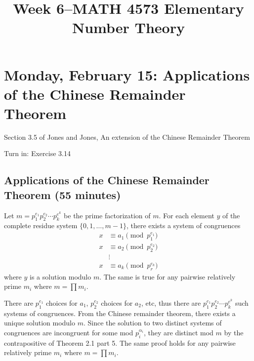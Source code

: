 \documentclass[letterpaper, 11 pt]{article}
\title{Week 6--MATH 4573 Elementary Number Theory}
\begin{document}
\maketitle
\tableofcontents

\section{Monday, February 15: Applications of the Chinese Remainder Theorem}
Section 3.5 of Jones and Jones, An extension of the Chinese Remainder Theorem

Turn in: Exercise 3.14
\subsection{Applications of the Chinese Remainder Theorem (55 minutes)}
\begin{thm}
 Let $m=p_1^{e_1}p_2^{e_2}\cdots p_k^{e^k}$ be the prime factorization of $m$. For each element $y$ of the complete residue system $\{0,1,\dots,m-1\}$, there exists a system of congruences 
 \begin{align*}
 x&\equiv a_1 \pmod{p_1^{e_1}}\\
 x&\equiv a_2 \pmod{p_2^{e_2}}\\
    &\vdots\\
  x&\equiv a_k \pmod{p_r^{e_k}}
\end{align*}
where $y$ is a solution modulo $m$. The same is true for any pairwise relatively prime $m_i$ where $m=\prod m_i$.
\end{thm}
\begin{solution}
There are $p_1^{e_1}$ choices for $a_1$, $p_2^{e_2}$ choices for $a_2$, etc, thus there are $p_1^{e_1}p_2^{e_2}\cdots p_k^{e^k}$ such systems of congruences. From the Chinese remainder theorem, there exists a unique solution modulo $m$. Since the solution to two distinct systems of congruences are incongruent for some mod $p_i^{\alpha_i}$, they are distinct mod $m$ by the contrapositive of Theorem 2.1 part 5. The same proof holds for  any pairwise relatively prime $m_i$ where $m=\prod m_i$.
\end{solution}
\end{document}
